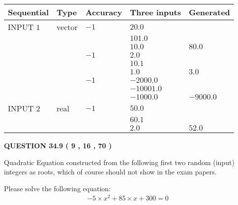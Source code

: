 \documentclass[12pt]{article}
\begin{document}
  
\noindent\begin{tabular}{|l|l|l|l|l|}
\hline
 Sequential & Type & Accuracy & Three inputs & Generated \\ 
\hline
 
 
  INPUT $            1 $ & vector & $           -1  $ & $
20.0
  $ & \\
  & & & $
101.0
  $ & \\
  & & & $
10.0
$ & $ 80.0 $ 
  \\
  & & $           -1  $ & $
2.0
  $ & \\
  & & & $
10.1
  $ & \\
  & & & $
1.0
$ & $ 3.0 $ 
  \\
  & & $           -1  $ & $
-2000.0
  $ & \\
  & & & $
-10001.0
  $ & \\
  & & & $
-1000.0
$ & $ -9000.0 $ 
 \\  \hline  
 
 
  INPUT $            2 $ & real & $           -1  $ & $
 50.0
  $ & \\
  & & &  $
 60.1
  $ & \\
  & & &  $
 2.0
 $ & $ 52.0 $ 
 \\  \hline  
 \end{tabular}
   
   
  
\vspace{0.2in}
  
{\textbf{\Large{QUESTION
34.9 
 (           9 ,          16 ,          70 )
}}}
  
  


\noindent{}
Quadratic Equation constructed from the following first two random (input) integers as roots,  
which of course should not show in the exam papers.  
\noindent{}


 
 

 
Please solve the following equation:
\begin{eqnarray*}
-5 \times x^2  %
+  %
85
                 \times x    %
+  %
300 =0
\end{eqnarray*}
 
 
 
\noindent{}
 
\end{document}
